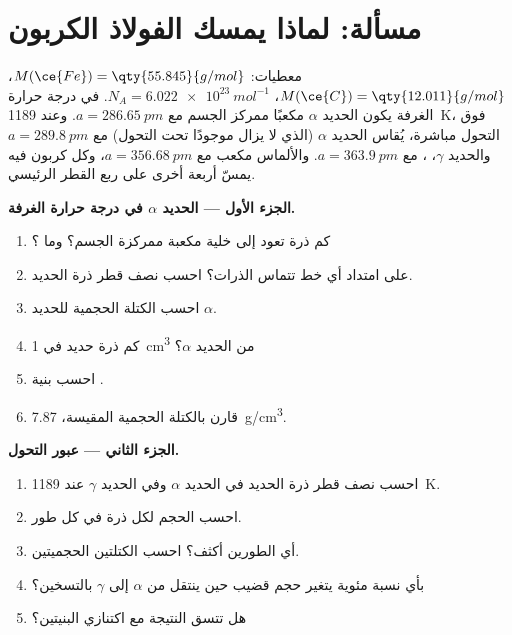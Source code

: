 \section{مسألة: لماذا يمسك الفولاذ الكربون}

\begin{problem}
\label{pb:b1:crystals-metals:1}
معطيات: $M(\ce{Fe}) = \qty{55.845}{g/mol}$، $M(\ce{C}) = \qty{12.011}{g/mol}$،
$N_A = \qty{6.022e23}{mol^{-1}}$. في درجة حرارة الغرفة يكون الحديد $\alpha$ مكعبًا ممركز الجسم
مع $a = \qty{286.65}{pm}$. وعند \qty{1189}{K}، فوق التحول مباشرة،
يُقاس الحديد $\alpha$ (الذي لا يزال موجودًا تحت التحول)
مع $a = \qty{289.8}{pm}$ والحديد $\gamma$، ، مع $a = \qty{363.9}{pm}$.
والألماس مكعب مع $a = \qty{356.68}{pm}$، وكل كربون فيه يمسّ أربعة
أخرى على ربع القطر الرئيسي.

\medskip
\noindent\textbf{الجزء الأول --- الحديد $\alpha$ في درجة حرارة الغرفة.}
\begin{enumerate}
  \item كم ذرة تعود إلى خلية مكعبة ممركزة الجسم؟ وما ؟
  \item على امتداد أي خط تتماس الذرات؟ احسب نصف قطر
        ذرة الحديد.
  \item احسب الكتلة الحجمية للحديد $\alpha$.
  \item كم ذرة حديد في \qty{1}{cm^3} من الحديد $\alpha$؟
  \item احسب  بنية .
  \item قارن بالكتلة الحجمية المقيسة، \qty{7.87}{g/cm^3}.
\end{enumerate}

\medskip
\noindent\textbf{الجزء الثاني --- عبور التحول.}
\begin{enumerate}[resume]
  \item احسب نصف قطر ذرة الحديد في الحديد $\alpha$ وفي
        الحديد $\gamma$ عند \qty{1189}{K}.
  \item احسب الحجم لكل ذرة في كل طور.
  \item أي الطورين أكثف؟ احسب الكتلتين الحجميتين.
  \item بأي نسبة مئوية يتغير حجم قضيب حين ينتقل
        من $\alpha$ إلى $\gamma$ بالتسخين؟
  \item هل تتسق النتيجة مع اكتنازي
        البنيتين؟
\end{enumerate}


\end{problem}
